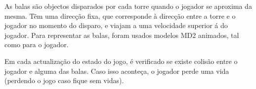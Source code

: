 As balas são objectos disparados por cada torre quando o jogador se aproxima da mesma.
Tẽm uma direcção fixa, que corresponde à direcção entre a torre e o jogador no momento do disparo, e viajam a uma velocidade superior á do jogador.
Para representar as balas, foram usados modelos MD2 animados, tal como para o jogador.

Em cada actualização do estado do jogo, é verificado se existe colisão entre o jogador e alguma das balas. Caso isso aconteça, o jogador perde uma vida (perdendo o jogo caso fique sem vidas).
